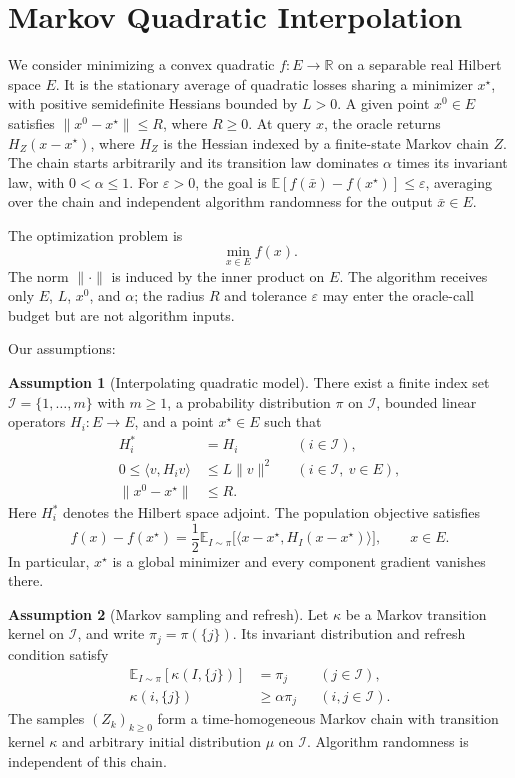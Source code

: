 \documentclass[10pt]{article}
\theoremstyle{definition}
\newtheorem{assumption}{Assumption}
\begin{document}
\section*{Markov Quadratic Interpolation}
We consider minimizing a convex quadratic $f:E\to\mathbb{R}$ on a separable real Hilbert space $E$. It is the stationary average of quadratic losses sharing a minimizer $x^\star$, with positive semidefinite Hessians bounded by $L>0$. A given point $x^0\in E$ satisfies $\|x^0-x^\star\|\leq R$, where $R\geq0$. At query $x$, the oracle returns $H_Z(x-x^\star)$, where $H_Z$ is the Hessian indexed by a finite-state Markov chain $Z$. The chain starts arbitrarily and its transition law dominates $\alpha$ times its invariant law, with $0<\alpha\leq1$. For $\varepsilon>0$, the goal is $\mathbb{E}[f(\bar{x})-f(x^\star)]\leq\varepsilon$, averaging over the chain and independent algorithm randomness for the output $\bar{x}\in E$.

The optimization problem is
\[
\min_{x\in E} f(x).
\]
The norm $\|\cdot\|$ is induced by the inner product on $E$. The algorithm receives only $E$, $L$, $x^0$, and $\alpha$; the radius $R$ and tolerance $\varepsilon$ may enter the oracle-call budget but are not algorithm inputs.

Our assumptions:
\begin{assumption}[Interpolating quadratic model]
There exist a finite index set $\mathcal{I}=\{1,\ldots,m\}$ with $m\geq1$, a probability distribution $\pi$ on $\mathcal{I}$, bounded linear operators $H_i:E\to E$, and a point $x^\star\in E$ such that
\[
\begin{aligned}
H_i^*&=H_i && (i\in\mathcal{I}),\\
0\leq\langle v,H_i v\rangle&\leq L\|v\|^2
&& (i\in\mathcal{I},\ v\in E),\\
\|x^0-x^\star\|&\leq R.
\end{aligned}
\]
Here $H_i^*$ denotes the Hilbert space adjoint. The population objective satisfies
\[
f(x)-f(x^\star)
=\frac{1}{2}\mathbb{E}_{I\sim\pi}
\bigl[\langle x-x^\star,H_I(x-x^\star)\rangle\bigr],
\qquad x\in E.
\]
In particular, $x^\star$ is a global minimizer and every component gradient vanishes there.
\end{assumption}

\begin{assumption}[Markov sampling and refresh]
Let $\kappa$ be a Markov transition kernel on $\mathcal{I}$, and write $\pi_j=\pi(\{j\})$. Its invariant distribution and refresh condition satisfy
\[
\begin{aligned}
\mathbb{E}_{I\sim\pi}[\kappa(I,\{j\})]&=\pi_j
&& (j\in\mathcal{I}),\\
\kappa(i,\{j\})&\geq\alpha\pi_j
&& (i,j\in\mathcal{I}).
\end{aligned}
\]
The samples $(Z_k)_{k\geq0}$ form a time-homogeneous Markov chain with transition kernel $\kappa$ and arbitrary initial distribution $\mu$ on $\mathcal{I}$. Algorithm randomness is independent of this chain.
\end{assumption}
\end{document}
